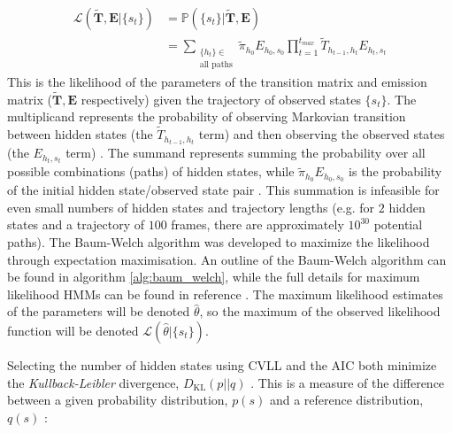 \begin{equation}\label{eqn:obs_lik_full}
\begin{split}
    \mathcal{L}\left(\tilde{\mathbf{T}}, \mathbf{E}| \{s_t\}\right) & = \mathbb{P}\left(\{s_t\} | \tilde{\mathbf{T}}, \mathbf{E}\right) \\
    & = \sum_{\substack{\{h_t\} \in \\ \text{all paths}}} \tilde{\pi}_{h_{0}}E_{h_{0},s_{0}}\prod_{t=1}^{t_{max}}\tilde{T}_{h_{t-1}, h_t}E_{h_t, s_t}    
\end{split}
\end{equation}
This is the likelihood of the parameters of the transition matrix and emission matrix ($\tilde{\mathbf{T}}, \mathbf{E}$ respectively) given the trajectory of observed states $\{s_t\}$. The multiplicand represents the probability of observing Markovian transition between hidden states (the $\tilde{T}_{h_{t-1}, h_{t}}$ term) and then  observing the observed states (the $E_{h_t, s_t}$ term) \cite{noeMarkovModelsMolecular2019b, rabinerTutorialHiddenMarkov1989}. The summand represents summing the probability over all possible combinations (paths) of hidden states, while $\tilde{\pi}_{h_{0}}E_{ h_{0}, s_{0}}$ is the probability of the initial hidden state/observed state pair \cite{noeMarkovModelsMolecular2019b, rabinerTutorialHiddenMarkov1989}. This summation is infeasible for even small numbers of hidden states and trajectory lengths (e.g. for $2$ hidden states and a trajectory of $100$ frames, there are approximately $10^{30}$ potential paths). The Baum-Welch algorithm \cite{rabinerTutorialHiddenMarkov1989} was developed to maximize the likelihood through expectation maximisation. An outline of the Baum-Welch algorithm can be found in algorithm \ref{alg:baum_welch}, while the full details for maximum likelihood HMMs can be found in reference \cite{noeProjectedHiddenMarkov2013a}. The maximum likelihood estimates of the parameters will be denoted $\hat{\theta}$, so the maximum of the observed likelihood function will be denoted $\mathcal{L}\left(\hat{\theta}|\{s_t\}\right)$. 

Selecting the number of hidden states using CVLL and the AIC both minimize the \emph{Kullback-Leibler} divergence, $D_{\mathrm{KL}}(p||q)$ \cite{mclachlanFiniteMixtureModels2000}. This is a measure of the difference between a given probability distribution, $p(s)$ and a reference distribution, $q(s)$ \cite{mackay2003information, kullbackInformationSufficiency1951}: 

